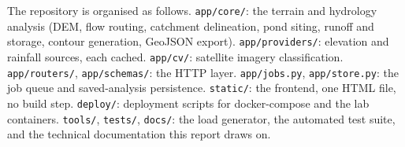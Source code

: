 \documentclass[manuscript,screen,review]{acmart}
\begin{document}
The repository is organised as follows.
\texttt{app/core/}: the terrain and hydrology analysis (DEM, flow routing, catchment
delineation, pond siting, runoff and storage, contour generation, GeoJSON export).
\texttt{app/providers/}: elevation and rainfall sources, each cached.
\texttt{app/cv/}: satellite imagery classification.
\texttt{app/routers/}, \texttt{app/schemas/}: the HTTP layer.
\texttt{app/jobs.py}, \texttt{app/store.py}: the job queue and saved-analysis
persistence.
\texttt{static/}: the frontend, one HTML file, no build step.
\texttt{deploy/}: deployment scripts for docker-compose and the lab containers.
\texttt{tools/}, \texttt{tests/}, \texttt{docs/}: the load generator, the automated
test suite, and the technical documentation this report draws on.
\end{document}
